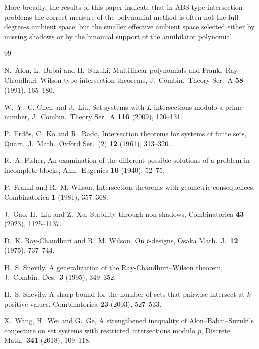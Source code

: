 \documentclass[11pt]{article}
\theoremstyle{plain}
\theoremstyle{remark}
\begin{document}
More broadly, the results of this paper indicate that in ABS-type intersection problems the correct measure of
the polynomial method is often not the full degree-$s$ ambient space, but the smaller effective ambient space
selected either by missing shadows or by the binomial support of the annihilator polynomial.
\begin{thebibliography}{99}

N.~Alon, L.~Babai and H.~Suzuki,
Multilinear polynomials and Frankl--Ray-Chaudhuri--Wilson type intersection theorems,
J.\ Combin.\ Theory Ser.\ A \textbf{58} (1991), 165--180.

W.~Y.~C. Chen and J.~Liu,
Set systems with $L$-intersections modulo a prime number, J.\ Combin.\ Theory Ser.\ A \textbf{116} (2009), 120--131.

P.~Erd\H{o}s, C.~Ko and R.~Rado,
Intersection theorems for systems of finite sets,
Quart.\ J.\ Math.\ Oxford Ser.\ (2) \textbf{12} (1961), 313--320.

R.~A. Fisher,
An examination of the different possible solutions of a problem in incomplete blocks, Ann.\ Eugenics \textbf{10} (1940), 52--75.

P.~Frankl and R.~M. Wilson,
Intersection theorems with geometric consequences,
 Combinatorica \textbf{1} (1981), 357--368.

J.~Gao, H.~Liu and Z.~Xu,
Stability through non-shadows,
Combinatorica \textbf{43} (2023), 1125--1137.

D.~K. Ray-Chaudhuri and R.~M. Wilson,
On $t$-designs,
Osaka Math.\ J.\ \textbf{12} (1975), 737--744.

H.~S. Snevily,
A generalization of the Ray-Chaudhuri--Wilson theorem,
J.\ Combin.\ Des.\ \textbf{3} (1995), 349--352.

H.~S. Snevily,
A sharp bound for the number of sets that pairwise intersect at $k$ positive values,
Combinatorica \textbf{23} (2003), 527--533.

X.~Wang, H.~Wei and G.~Ge,
A strengthened inequality of Alon--Babai--Suzuki's conjecture on set systems with restricted intersections modulo $p$,
Discrete Math.\ \textbf{341} (2018), 109--118.
\end{thebibliography}
\end{document}
